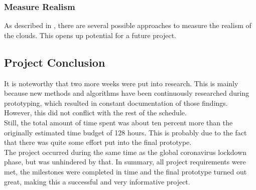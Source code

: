 \subsubsection{Measure Realism}
As described in , there are several possible approaches to measure the realism of the clouds. This opens up potential for a future project.

\subsection{Project Conclusion}
It is noteworthy that two more weeks were put into research. This is mainly because new methods and algorithms have been continuously researched during prototyping, which resulted in constant documentation of those findings.
However, this did not conflict with the rest of the schedule.
\\
Still, the total amount of time spent was about ten percent more than the originally estimated time budget of 128 hours. This is probably due to the fact that there was quite some effort put into the final prototype.
\\
The project occurred during the same time as the global coronavirus lockdown phase, but was unhindered by that.
\emptyline
In summary, all project requirements were met, the milestones were completed in time and the final prototype turned out great, making this a successful and very informative project.